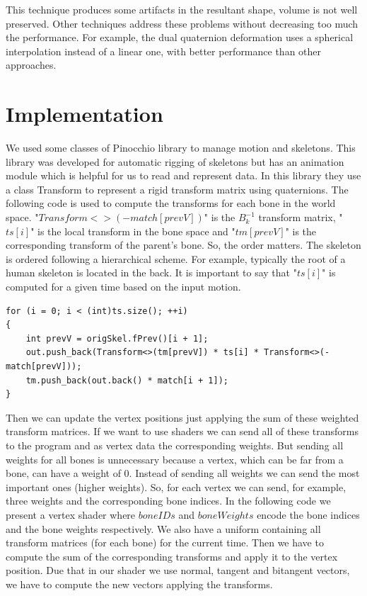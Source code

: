 \documentclass[10pt]{article} %
\begin{document}
This technique produces some artifacts in the resultant shape, volume is not well preserved. Other techniques address these problems without decreasing too much the performance. For example, the dual quaternion deformation \cite{dual} uses a spherical interpolation instead of a linear one, with better performance than other approaches.

\section{Implementation}

We used some classes of Pinocchio \cite{pinocchio} library to manage motion and skeletons. This library was developed for automatic rigging of skeletons but has an animation module which is helpful for us to read and represent data. In this library they use a class Transform to represent a rigid transform matrix using quaternions. The following code is used to compute the transforms for each bone in the world space. "$Transform<>(-match[prevV])$" is the $B_k^{-1}$ transform matrix, "$ts[i]$" is the local transform in the bone space and "$tm[prevV]$" is the corresponding transform of the parent's bone. So, the order matters. The skeleton is ordered following a hierarchical scheme. For example, typically the root of a human skeleton is located in the back. It is important to say that "$ts[i]$" is computed for a given time based on the input motion.

\begin{lstlisting}[basicstyle=\footnotesize\ttfamily ,breaklines=true, frame=single]
for (i = 0; i < (int)ts.size(); ++i) 
{
	int prevV = origSkel.fPrev()[i + 1];
	out.push_back(Transform<>(tm[prevV]) * ts[i] * Transform<>(-match[prevV]));
	tm.push_back(out.back() * match[i + 1]);
}
\end{lstlisting}

Then we can update the vertex positions just applying the sum of these weighted transform matrices. If we want to use shaders we can send all of these transforms to the program and as vertex data the corresponding weights. But sending all weights for all bones is unnecessary because a vertex, which can be far from a bone, can have a weight of 0. Instead of sending all weights we can send the most important ones (higher weights). So, for each vertex we can send, for example, three weights and the corresponding bone indices. In the following code we present a vertex shader where  $boneIDs$ and $boneWeights$ encode the bone indices and the bone weights respectively. We also have a uniform containing all transform matrices (for each bone) for the current time. Then we have to compute the sum of the corresponding transforms and apply it to the vertex position. Due that in our shader we use normal, tangent and bitangent vectors, we have to compute the new vectors applying the transforms.
\end{document}
